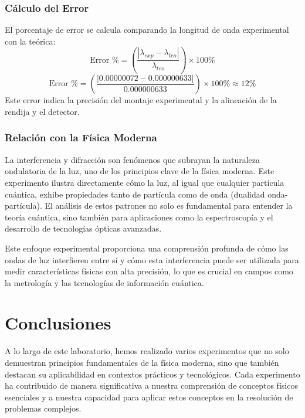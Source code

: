 \subsubsection{Cálculo del Error}
El porcentaje de error se calcula comparando la longitud de onda experimental con la teórica:
\[
\text{Error \%} = \left(\frac{\left| \lambda_{exp} - \lambda_{teo} \right|}{\lambda_{teo}}\right) \times 100\%
\]
\[
\text{Error \%} = \left(\frac{\left| 0.00000072 - 0.000000633 \right|}{0.000000633}\right) \times 100\% \approx 12\%
\]
Este error indica la precisión del montaje experimental y la alineación de la rendija y el detector.

\subsubsection{Relación con la Física Moderna}
La interferencia y difracción son fenómenos que subrayan la naturaleza ondulatoria de la luz, uno de los principios clave de la física moderna. Este experimento ilustra directamente cómo la luz, al igual que cualquier partícula cuántica, exhibe propiedades tanto de partícula como de onda (dualidad onda-partícula). El análisis de estos patrones no solo es fundamental para entender la teoría cuántica, sino también para aplicaciones como la espectroscopía y el desarrollo de tecnologías ópticas avanzadas.

Este enfoque experimental proporciona una comprensión profunda de cómo las ondas de luz interfieren entre sí y cómo esta interferencia puede ser utilizada para medir características físicas con alta precisión, lo que es crucial en campos como la metrología y las tecnologías de información cuántica.

\section{Conclusiones}
A lo largo de este laboratorio, hemos realizado varios experimentos que no solo demuestran principios fundamentales de la física moderna, sino que también destacan su aplicabilidad en contextos prácticos y tecnológicos. Cada experimento ha contribuido de manera significativa a nuestra comprensión de conceptos físicos esenciales y a nuestra capacidad para aplicar estos conceptos en la resolución de problemas complejos.

